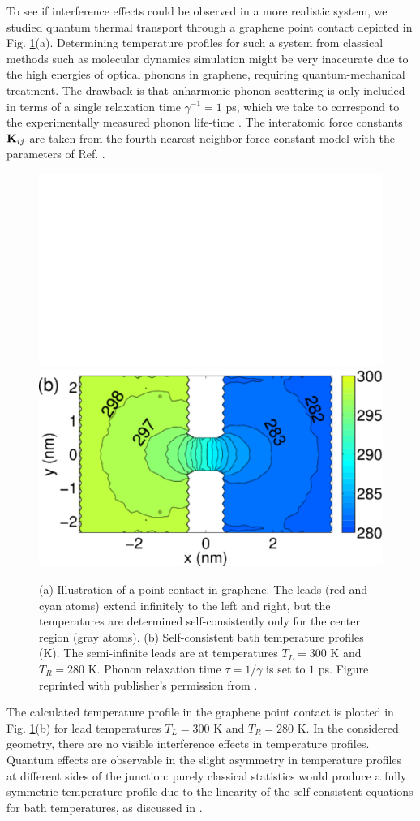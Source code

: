 To see if interference effects could be observed in a more realistic system, we studied quantum thermal transport through a graphene point contact depicted in Fig. \ref{fig:gf_fig8}(a). Determining temperature profiles for such a system from classical methods such as molecular dynamics simulation might be very inaccurate due to the high energies of optical phonons in graphene, requiring quantum-mechanical treatment. The drawback is that anharmonic phonon scattering is only included in terms of a single relaxation time $\gamma^{-1}=1$ ps, which we take to correspond to the experimentally measured phonon life-time \cite{bonini12}. The interatomic force constants $\mathbf{K}_{ij}$ are taken from the fourth-nearest-neighbor force constant model \cite{saito} with the parameters of Ref. \cite{wirtz04}. 

\begin{figure}
 \begin{center}
 \includegraphics[width=.49\columnwidth]{pics/gf_fig8a.pdf}
 \includegraphics[width=.49\columnwidth]{pics/gf_fig8b.pdf}
 \end{center}
 \caption{(a) Illustration of a point contact in graphene. The leads (red and cyan atoms) extend infinitely to the left and right, but the temperatures are determined self-consistently only for the center region (gray atoms). (b) Self-consistent bath temperature profiles (K). The semi-infinite leads are at temperatures $T_L=300$ K and $T_R=280$ K. Phonon relaxation time $\tau=1/\gamma$ is set to $1$ ps. Figure reprinted with publisher's permission from .}
 \label{fig:gf_fig8}
\end{figure}

The calculated temperature profile in the graphene point contact is plotted in Fig. \ref{fig:gf_fig8}(b) for lead temperatures $T_L=300$ K and $T_R=280$ K. In the considered geometry, there are no visible interference effects in temperature profiles. Quantum effects are observable in the slight asymmetry in temperature profiles at different sides of the junction: purely classical statistics would produce a fully symmetric temperature profile due to the linearity of the self-consistent equations for bath temperatures, as discussed in .

